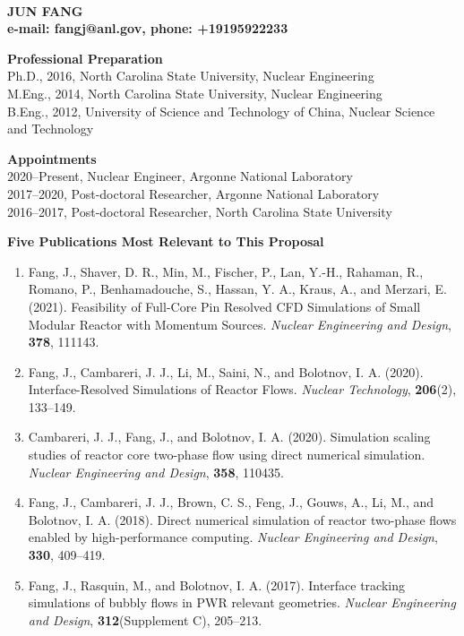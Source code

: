 \documentclass[11pt,letterpaper,english]{article}
\begin{document}
\setlength{\parindent}{0in} %

\pagestyle{fancy}   \renewcommand{%
\headrulewidth}{0.0pt}

\\
{\bf JUN FANG}\\
{\bf e-mail: fangj@anl.gov, phone: +19195922233} \smallskip

\begin{flushleft} {\bf Professional Preparation}
{\parindent 16pt
   ~\\
   Ph.D.,  2016, North Carolina State University, Nuclear Engineering \\
   M.Eng., 2014, North Carolina State University, Nuclear Engineering \\
   B.Eng., 2012, University of Science and Technology of China, Nuclear Science and Technology \\
}

\vspace{.04in}
{\bf Appointments}
{\parindent 16pt
  ~\\
  2020--Present, Nuclear Engineer, Argonne National Laboratory \\
  2017--2020, Post-doctoral Researcher, Argonne National Laboratory\\
  2016--2017, Post-doctoral Researcher, North Carolina State University\\
}

\vspace{.04in}
{\bf Five Publications Most Relevant to This Proposal}
\vspace{-6pt}
\begin{enumerate} \itemsep1pt \parskip0pt 
\item Fang, J., Shaver, D. R., Min, M., Fischer, P., Lan, Y.-H., Rahaman, R., Romano, P., Benhamadouche, S., Hassan, Y. A., Kraus, A., and Merzari, E. (2021). Feasibility of Full-Core Pin Resolved CFD Simulations of Small Modular Reactor with Momentum Sources. \textit{Nuclear Engineering and Design}, {\bf 378}, 111143.
\item Fang, J., Cambareri, J. J., Li, M., Saini, N., and Bolotnov, I. A. (2020). Interface-Resolved Simulations of Reactor Flows. \textit{Nuclear Technology}, {\bf 206}(2), 133–149. 
\item Cambareri, J. J., Fang, J., and Bolotnov, I. A. (2020). Simulation scaling studies of reactor core two-phase flow using direct numerical simulation. \textit{Nuclear Engineering and Design}, {\bf 358}, 110435. 
\item Fang, J., Cambareri, J. J., Brown, C. S., Feng, J., Gouws, A., Li, M., and Bolotnov, I. A. (2018). Direct numerical simulation of reactor two-phase flows enabled by high-performance computing. \textit{Nuclear Engineering and Design}, {\bf 330}, 409–419.
\item Fang, J., Rasquin, M., and Bolotnov, I. A. (2017). Interface tracking simulations of bubbly flows in PWR relevant geometries. \textit{Nuclear Engineering and Design}, {\bf 312}(Supplement C), 205–213. 
\end{enumerate}


\end{flushleft}
\end{document}
